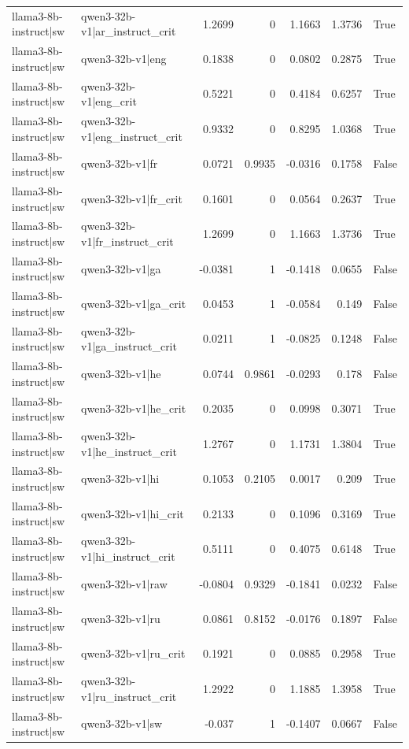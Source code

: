 \begin{table}
\begin{tabular}{l l r r r r l}
llama3-8b-instruct|sw & qwen3-32b-v1|ar_instruct_crit & 1.2699 & 0 & 1.1663 & 1.3736 & True \\
llama3-8b-instruct|sw & qwen3-32b-v1|eng & 0.1838 & 0 & 0.0802 & 0.2875 & True \\
llama3-8b-instruct|sw & qwen3-32b-v1|eng_crit & 0.5221 & 0 & 0.4184 & 0.6257 & True \\
llama3-8b-instruct|sw & qwen3-32b-v1|eng_instruct_crit & 0.9332 & 0 & 0.8295 & 1.0368 & True \\
llama3-8b-instruct|sw & qwen3-32b-v1|fr & 0.0721 & 0.9935 & -0.0316 & 0.1758 & False \\
llama3-8b-instruct|sw & qwen3-32b-v1|fr_crit & 0.1601 & 0 & 0.0564 & 0.2637 & True \\
llama3-8b-instruct|sw & qwen3-32b-v1|fr_instruct_crit & 1.2699 & 0 & 1.1663 & 1.3736 & True \\
llama3-8b-instruct|sw & qwen3-32b-v1|ga & -0.0381 & 1 & -0.1418 & 0.0655 & False \\
llama3-8b-instruct|sw & qwen3-32b-v1|ga_crit & 0.0453 & 1 & -0.0584 & 0.149 & False \\
llama3-8b-instruct|sw & qwen3-32b-v1|ga_instruct_crit & 0.0211 & 1 & -0.0825 & 0.1248 & False \\
llama3-8b-instruct|sw & qwen3-32b-v1|he & 0.0744 & 0.9861 & -0.0293 & 0.178 & False \\
llama3-8b-instruct|sw & qwen3-32b-v1|he_crit & 0.2035 & 0 & 0.0998 & 0.3071 & True \\
llama3-8b-instruct|sw & qwen3-32b-v1|he_instruct_crit & 1.2767 & 0 & 1.1731 & 1.3804 & True \\
llama3-8b-instruct|sw & qwen3-32b-v1|hi & 0.1053 & 0.2105 & 0.0017 & 0.209 & True \\
llama3-8b-instruct|sw & qwen3-32b-v1|hi_crit & 0.2133 & 0 & 0.1096 & 0.3169 & True \\
llama3-8b-instruct|sw & qwen3-32b-v1|hi_instruct_crit & 0.5111 & 0 & 0.4075 & 0.6148 & True \\
llama3-8b-instruct|sw & qwen3-32b-v1|raw & -0.0804 & 0.9329 & -0.1841 & 0.0232 & False \\
llama3-8b-instruct|sw & qwen3-32b-v1|ru & 0.0861 & 0.8152 & -0.0176 & 0.1897 & False \\
llama3-8b-instruct|sw & qwen3-32b-v1|ru_crit & 0.1921 & 0 & 0.0885 & 0.2958 & True \\
llama3-8b-instruct|sw & qwen3-32b-v1|ru_instruct_crit & 1.2922 & 0 & 1.1885 & 1.3958 & True \\
llama3-8b-instruct|sw & qwen3-32b-v1|sw & -0.037 & 1 & -0.1407 & 0.0667 & False \\

\end{tabular}
\end{table}
